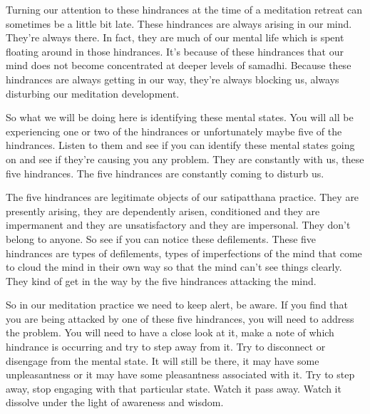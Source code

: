 \documentclass[letterpaper,10pt,english]{sphinxmanual}
\begin{document}
\sphinxAtStartPar
Turning our attention to these hindrances at the time of a meditation
retreat can sometimes be a little bit late. These hindrances are always arising in our mind. They’re always there. In fact, they are much of our mental
life which is spent floating around in those hindrances. It’s because of these
hindrances that our mind does not become concentrated at deeper levels of
samadhi.  Because  these  hindrances  are  always  getting  in  our  way,  they’re
always blocking us, always disturbing our meditation development.

\sphinxAtStartPar
So what we will be doing here is identifying these mental states. You
will all be experiencing one or two of the hindrances or unfortunately maybe
five of the hindrances. Listen to them and see if you can identify these mental
states going on and see if they’re causing you any problem.
They are constantly with us, these five
hindrances. The five hindrances are constantly coming to disturb us.

\sphinxAtStartPar
The five hindrances are legitimate objects of our satipatthana practice.
They are presently arising, they are dependently arisen, conditioned and they
are impermanent and they are unsatisfactory and they are impersonal. They
don’t belong to anyone. So see if you can notice these defilements. These
five hindrances are types of defilements, types of imperfections of the mind
that  come  to  cloud  the  mind  in  their  own  way  so  that  the  mind  can’t  see
things clearly. They kind of get in the way by the five hindrances attacking
the mind.

\sphinxAtStartPar
So in our meditation practice we need to keep alert, be aware. If you
find  that  you  are  being  attacked  by  one  of  these  five  hindrances,  you  will
need to address the problem. You will need to have a close look at it, make
a note of which hindrance is occurring and try to step away from it. Try to
  disconnect or disengage from the mental state. It will still be there, it may
have some unpleasantness or it may have some pleasantness associated with
it. Try to step away, stop engaging with that particular state. Watch it pass
away. Watch it dissolve under the light of awareness and wisdom.
\end{document}
